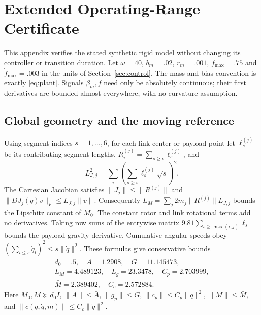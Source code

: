 \section{Extended Operating-Range Certificate}\label{app:embedding}
This appendix verifies the stated synthetic rigid model without changing its controller or transition duration. Let $\omega=40$, $b_m=.02$, $r_m=.001$, $f_{\max}=.75$ and $\dot f_{\max}=.003$ in the units of Section~\ref{sec:control}. The mass and bias convention is exactly \eqref{eq:plant}. Signals $\beta_m,f$ need only be absolutely continuous; their first derivatives are bounded almost everywhere, with no curvature assumption.

\subsection{Global geometry and the moving reference}
Using segment indices $s=1,\ldots,6$, for each link center or payload point let $\ell_s^{(j)}$ be its contributing segment lengths, $R_i^{(j)}=\sum_{s\ge i}\ell_s^{(j)}$, and
\begin{equation}
 L_{J,j}^2=\sum_i\left(\sum_{s\ge i}\ell_s^{(j)}\sqrt{s}\right)^2.
\end{equation}
The Cartesian Jacobian satisfies $\|J_j\|\le\|R^{(j)}\|$ and $\|D J_j(q)v\|_F\le L_{J,j}\|v\|$. Consequently $L_M=\sum_j2m_j\|R^{(j)}\|L_{J,j}$ bounds the Lipschitz constant of $M_0$. The constant rotor and link rotational terms add no derivatives. Taking row sums of the entrywise matrix $9.81\sum_{s\ge\max(i,j)}\ell_s$ bounds the payload gravity derivative. Cumulative angular speeds obey $(\sum_{i\le s}\dot q_i)^2\le s\|\dot q\|^2$. These formulas give conservative bounds
\begin{equation}
\begin{gathered}
 d_0=.5,\quad \bar A=1.2908,\quad G=11.145473,\\
 L_M=4.489123,\quad L_g=23.3478,\quad C_p=2.703999,\\
 \bar M=2.389402,\quad C_c=2.572884.
\end{gathered}\label{eq:geometry_caps}
\end{equation}
Here $M_0,M\succeq d_0I$, $\|A\|\le\bar A$, $\|g_p\|\le G$, $\|c_p\|\le C_p\|\dot q\|^2$, $\|M\|\le\bar M$, and $\|c(q,\dot q,m)\|\le C_c\|\dot q\|^2$.

